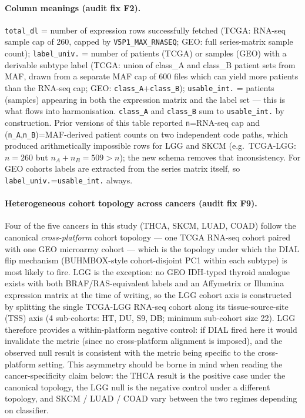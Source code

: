\documentclass[11pt,a4paper]{article}
\begin{document}
\paragraph{Column meanings (audit fix F2).} \texttt{total\_dl} = number of expression rows successfully fetched (TCGA: RNA-seq sample cap of 260, capped by \texttt{V5P1\_MAX\_RNASEQ}; GEO: full series-matrix sample count); \texttt{label\_univ.} = number of patients (TCGA) or samples (GEO) with a derivable subtype label (TCGA: union of class\_A and class\_B patient sets from MAF, drawn from a separate MAF cap of 600 files which can yield more patients than the RNA-seq cap; GEO: \texttt{class\_A}+\texttt{class\_B}); \texttt{usable\_int.} = patients (samples) appearing in both the expression matrix and the label set --- this is what flows into harmonisation. \texttt{class\_A} and \texttt{class\_B} sum to \texttt{usable\_int.} by construction. Prior versions of this table reported \texttt{n}=RNA-seq cap and (\texttt{n\_A},\texttt{n\_B})=MAF-derived patient counts on two independent code paths, which produced arithmetically impossible rows for LGG and SKCM (e.g.\ TCGA-LGG: $n=260$ but $n_A+n_B=509>n$); the new schema removes that inconsistency. For GEO cohorts labels are extracted from the series matrix itself, so \texttt{label\_univ.}=\texttt{usable\_int.} always.

\paragraph{Heterogeneous cohort topology across cancers (audit fix F9).}
Four of the five cancers in this study (THCA, SKCM, LUAD, COAD) follow
the canonical \emph{cross-platform} cohort topology --- one TCGA RNA-seq
cohort paired with one GEO microarray cohort --- which is the topology
under which the DIAL flip mechanism (BUHMBOX-style cohort-disjoint PC1
within each subtype) is most likely to fire. LGG is the exception:
no GEO IDH-typed thyroid analogue exists with both BRAF/RAS-equivalent
labels and an Affymetrix or Illumina expression matrix at the time of
writing, so the LGG cohort axis is constructed by splitting the single
TCGA-LGG RNA-seq cohort along its tissue-source-site (TSS) axis (4
sub-cohorts: HT, DU, S9, DB; minimum sub-cohort size 22). LGG therefore
provides a within-platform negative control: if DIAL fired here it
would invalidate the metric (since no cross-platform alignment is
imposed), and the observed null result is consistent with the metric
being specific to the cross-platform setting. This asymmetry should
be borne in mind when reading the cancer-specificity claim below: the
THCA result is the positive case under the canonical topology, the
LGG null is the negative control under a different topology, and
SKCM / LUAD / COAD vary between the two regimes depending on classifier.
\end{document}
